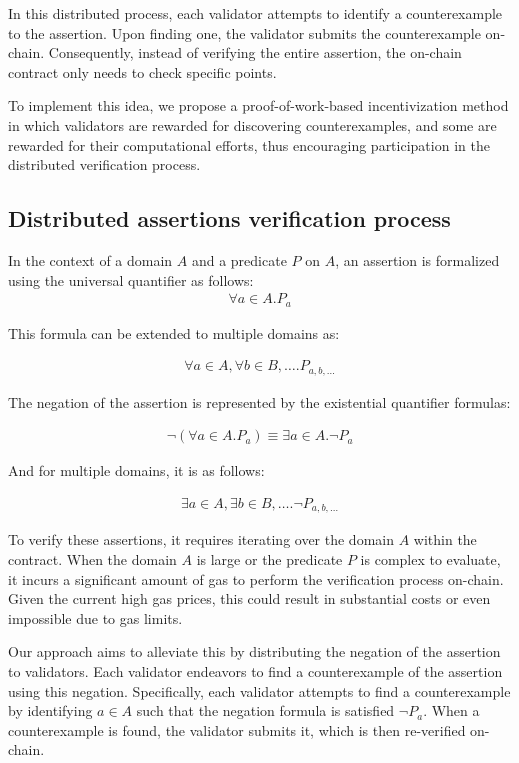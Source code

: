 \documentclass[runningheads]{llncs}
\begin{document}
In this distributed process, each validator attempts to identify a counterexample to the assertion. Upon finding one, the validator submits the counterexample on-chain. Consequently, instead of verifying the entire assertion, the on-chain contract only needs to check specific points.

To implement this idea, we propose a proof-of-work-based incentivization method in which validators are rewarded for discovering counterexamples, and some are rewarded for their computational efforts, thus encouraging participation in the distributed verification process.



\subsection{Distributed assertions verification process}
In the context of a domain $A$ and a predicate $P$ on $A$, an assertion is formalized using the universal quantifier as follows:
\begin{gather}
  \label{eq:1}
\forall a \in A. P_{a}
\end{gather}

This formula can be extended to multiple domains as:

\begin{gather}
\label{eq:2}
\forall a \in A, \forall b \in B, \dots .P_{a, b, \dots}
\end{gather} 

The negation of the assertion is represented by the existential quantifier formulas:

\begin{gather}
\label{eq:3}
\neg (\forall a \in A. P_{a}) \equiv \exists a \in A. \neg P_{a}
\end{gather}

And for multiple domains, it is as follows:

\begin{gather}
\label{eq:4}
\exists a \in A, \exists b \in B, \dots. \neg P_{a, b, \dots}
\end{gather}

To verify these assertions, it requires iterating over the domain $A$ within the contract. When the domain $A$ is large or the predicate $P$ is complex to evaluate, it incurs a significant amount of gas to perform the verification process on-chain.  Given the current high gas prices, this could result in substantial costs or even impossible due to gas limits. 

Our approach aims to alleviate this by distributing the negation of the assertion to validators. Each validator endeavors to find a counterexample of the assertion using this negation. Specifically, each validator attempts to find a counterexample by identifying $a \in A$ such that the negation formula is satisfied $\neg P_{a}$. When a counterexample is found, the validator submits it, which is then re-verified on-chain. 
\end{document}
